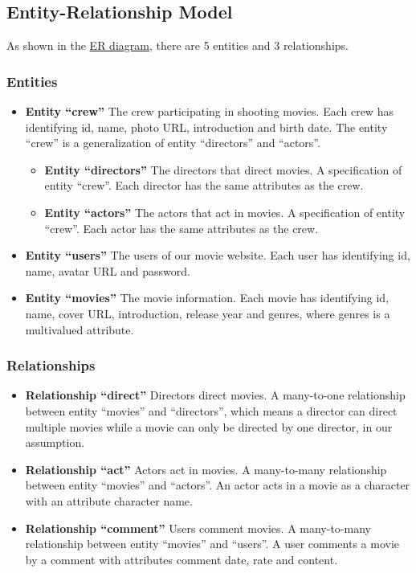 \begin{CJK*}{UTF8}{gbsn}
\subsection{Entity-Relationship Model}
As shown in the \hyperref[ERD]{ER diagram}, there are 5 entities and 3 relationships. 
\subsubsection{Entities}
\begin{itemize}
\item \textbf{Entity ``crew''} The crew participating in shooting movies. Each crew has identifying id, name, photo URL, introduction and birth date. The entity ``crew'' is a generalization of entity ``directors'' and ``actors''.
\begin{itemize}
\item \textbf{Entity ``directors''} The directors that direct movies. A specification of entity ``crew''. Each director has the same attributes as the crew. 
\item \textbf{Entity ``actors''} The actors that act in movies. A specification of entity ``crew''. Each actor has the same attributes as the crew. 
\end{itemize}
\item \textbf{Entity ``users''} The users of our movie website. Each user has identifying id, name, avatar URL and password. 
\item \textbf{Entity ``movies''} The movie information. Each movie has identifying id, name, cover URL, introduction, release year and genres, where genres is a multivalued attribute.
\end{itemize}
\subsubsection{Relationships}
\begin{itemize}
\item \textbf{Relationship ``direct''} Directors direct movies. A many-to-one relationship between entity ``movies'' and ``directors'', which means a director can direct multiple movies while a movie can only be directed by one director, in our assumption. 
\item \textbf{Relationship ``act''} Actors act in movies. A many-to-many relationship between entity ``movies'' and ``actors''. An actor acts in a movie as a character with an attribute character name. 
\item \textbf{Relationship ``comment''} Users comment movies. A many-to-many relationship between entity ``movies'' and ``users''. A user comments a movie by a comment with attributes comment date, rate and content. 
\end{itemize}


\end{CJK*}
